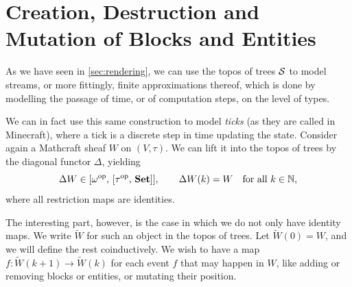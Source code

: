 \section{Creation, Destruction and Mutation of Blocks and Entities}\label{sec:creation-destruction}

As we have seen in \cref{sec:rendering}, we can use the topos of trees
$\mathcal{S}$ to model streams, or more fittingly, finite approximations
thereof, which is done by modelling the passage of time, or of computation
steps, on the level of types.

We can in fact use this same construction to model \emph{ticks} (as they are
called in Minecraft), where a tick is a discrete step in time updating the
state. Consider again a Mathcraft
sheaf $W$ on $(V, \tau)$. We can lift it into the topos of trees by the
diagonal functor $\Delta$, yielding
\[
	\Delta W \in [\omega^{\mathrm{op}},\, [\tau^{\mathrm{op}},\, \mathbf{Set}]],
	\qquad
	\Delta W(k) = W \quad \text{for all } k \in \mathbb{N},
\]
where all restriction maps are identities.

The interesting part, however, is the case in which we do not only have
identity maps. We write $\tilde{W}$ for such an object in the topos of trees.
Let $\tilde{W}(0) = W$, and we will define the rest coinductively. We
wish to have a map $f \colon \tilde{W}(k+1) \to \tilde{W}(k)$ for each event $f$ that may
happen in $W$, like adding or removing blocks or entities, or mutating their
position.

